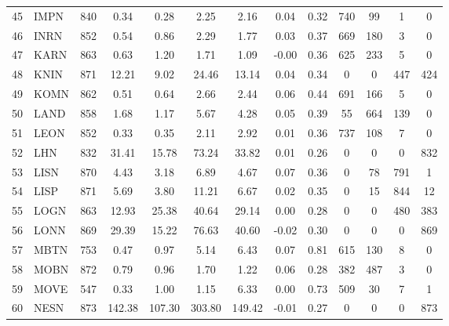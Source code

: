 \documentclass[11pt,a4paper]{article}
\begin{document}
\begin{doublespacing}
\begin{small}
\begin{longtable}{llc|cc|cc|cc|cccc}
                45  & IMPN  & 840 & 0.34   & 0.28     & 2.25   & 2.16     & 0.04  & 0.32     & 740   & 99    & 1     & 0     \\
                46  & INRN  & 852 & 0.54   & 0.86     & 2.29   & 1.77     & 0.03  & 0.37     & 669   & 180   & 3     & 0     \\
                47  & KARN  & 863 & 0.63   & 1.20     & 1.71   & 1.09     & -0.00 & 0.36     & 625   & 233   & 5     & 0     \\
                48  & KNIN  & 871 & 12.21  & 9.02     & 24.46  & 13.14    & 0.04  & 0.34     & 0     & 0     & 447   & 424   \\
                49  & KOMN  & 862 & 0.51   & 0.64     & 2.66   & 2.44     & 0.06  & 0.44     & 691   & 166   & 5     & 0     \\
                50  & LAND  & 858 & 1.68   & 1.17     & 5.67   & 4.28     & 0.05  & 0.39     & 55    & 664   & 139   & 0     \\
                51  & LEON  & 852 & 0.33   & 0.35     & 2.11   & 2.92     & 0.01  & 0.36     & 737   & 108   & 7     & 0     \\
                52  & LHN   & 832 & 31.41  & 15.78    & 73.24  & 33.82    & 0.01  & 0.26     & 0     & 0     & 0     & 832   \\
                53  & LISN  & 870 & 4.43   & 3.18     & 6.89   & 4.67     & 0.07  & 0.36     & 0     & 78    & 791   & 1     \\
                54  & LISP  & 871 & 5.69   & 3.80     & 11.21  & 6.67     & 0.02  & 0.35     & 0     & 15    & 844   & 12    \\
                55  & LOGN  & 863 & 12.93  & 25.38    & 40.64  & 29.14    & 0.00  & 0.28     & 0     & 0     & 480   & 383   \\
                56  & LONN  & 869 & 29.39  & 15.22    & 76.63  & 40.60    & -0.02 & 0.30     & 0     & 0     & 0     & 869   \\
                57  & MBTN  & 753 & 0.47   & 0.97     & 5.14   & 6.43     & 0.07  & 0.81     & 615   & 130   & 8     & 0     \\
                58  & MOBN  & 872 & 0.79   & 0.96     & 1.70   & 1.22     & 0.06  & 0.28     & 382   & 487   & 3     & 0     \\
                59  & MOVE  & 547 & 0.33   & 1.00     & 1.15   & 6.33     & 0.00  & 0.73     & 509   & 30    & 7     & 1     \\
                60  & NESN  & 873 & 142.38 & 107.30   & 303.80 & 149.42   & -0.01 & 0.27     & 0     & 0     & 0     & 873   \\

\end{longtable}
\end{small}
\end{doublespacing}
\end{document}
